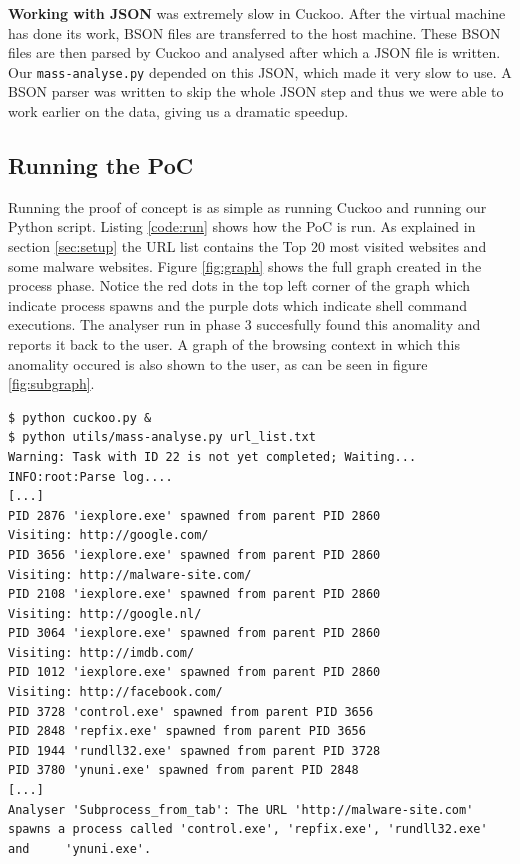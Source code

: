\textbf{Working with JSON} was extremely slow in Cuckoo. After the virtual machine has done its work, BSON files are transferred to the host machine. These BSON files are then parsed by Cuckoo and analysed after which a JSON file is written. Our \texttt{mass-analyse.py} depended on this JSON, which made it very slow to use. A BSON parser was written to skip the whole JSON step and thus we were able to work earlier on the data, giving us a dramatic speedup.

\subsection{Running the PoC}

Running the proof of concept is as simple as running Cuckoo and running our Python script. Listing \ref{code:run} shows how the PoC is run. As explained in section \ref{sec:setup} the URL list contains the Top 20 most visited websites and some malware websites. Figure \ref{fig:graph} shows the full graph created in the process phase. Notice the red dots in the top left corner of the graph which indicate process spawns and the purple dots which indicate shell command executions. The analyser run in phase 3 succesfully found this anomality and reports it back to the user. A graph of the browsing context in which this anomality occured is also shown to the user, as can be seen in figure \ref{fig:subgraph}.

\begin{lstlisting}[caption={Mass analyser being run},label={code:run}]
$ python cuckoo.py &
$ python utils/mass-analyse.py url_list.txt
Warning: Task with ID 22 is not yet completed; Waiting...
INFO:root:Parse log....
[...]
PID 2876 'iexplore.exe' spawned from parent PID 2860
Visiting: http://google.com/
PID 3656 'iexplore.exe' spawned from parent PID 2860
Visiting: http://malware-site.com/
PID 2108 'iexplore.exe' spawned from parent PID 2860
Visiting: http://google.nl/
PID 3064 'iexplore.exe' spawned from parent PID 2860
Visiting: http://imdb.com/
PID 1012 'iexplore.exe' spawned from parent PID 2860
Visiting: http://facebook.com/
PID 3728 'control.exe' spawned from parent PID 3656
PID 2848 'repfix.exe' spawned from parent PID 3656
PID 1944 'rundll32.exe' spawned from parent PID 3728
PID 3780 'ynuni.exe' spawned from parent PID 2848
[...]
Analyser 'Subprocess_from_tab': The URL 'http://malware-site.com' spawns a process called 'control.exe', 'repfix.exe', 'rundll32.exe' and     'ynuni.exe'.
\end{lstlisting}

